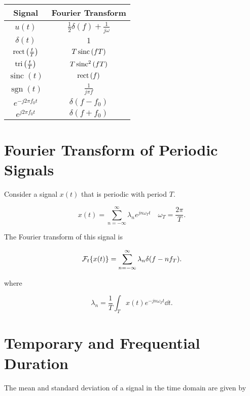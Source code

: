 \documentclass{report}
\newcommand{\Ft}[1]{\SF_t\!\lt\{ #1 \rt\}}
\DeclareMathOperator{\rect}{rect}
\DeclareMathOperator{\tri}{tri}
\DeclareMathOperator{\sinc}{sinc}
\DeclareMathOperator{\sgn}{sgn}
\begin{document}
\begin{table}
	\centering
	{
		\renewcommand{\arraystretch}{1.2}
		\begin{tabular}{c|c}
			\textbf{Signal}            & \textbf{Fourier Transform}                  \\
			\hline
			$u(t)$                     & $\frac{1}{2}\delta(f) + \frac{1}{j \omega}$ \\
			$\delta(t)$                & $1$                                         \\
			$\rect\lt(\frac{t}{T}\rt)$ & $T\sinc\lt(fT\rt)$                          \\
			$\tri\lt(\frac{t}{T}\rt)$  & $T\sinc^2\lt(fT\rt)$                        \\
			$\sinc(t)$                 & $\rect\lt(f\rt)$                            \\
			$\sgn(t)$                  & $\frac{1}{j\pi f}$                          \\
			$e^{-j2\pi f_0t}$          & $\delta(f-f_0)$                             \\
			$e^{j2\pi f_0t}$           & $\delta(f+f_0)$                             \\
		\end{tabular}
	}
\end{table}

\section{Fourier Transform of Periodic Signals}

Consider a signal $x(t)$ that is periodic with period $T$.

\[
	x(t) = \sum_{n=-\infty}^{\infty} \lambda_n e^{jn\omega_Tt} \quad \omega_T = \frac{2\pi}{T}
	.\]

The Fourier transform of this signal is

\[
	\Ft{x(t)} = \sum_{n=-\infty}^{\infty} \lambda_n \delta(f-nf_T)
	.\]

where

\[
	\lambda_n = \frac{1}{T}\int_{T} x(t)e^{-jn\omega_Tt} \dd{t}
	.\]

\section{Temporary and Frequential Duration}

The mean and standard deviation of a signal in the time domain are given by
\end{document}
